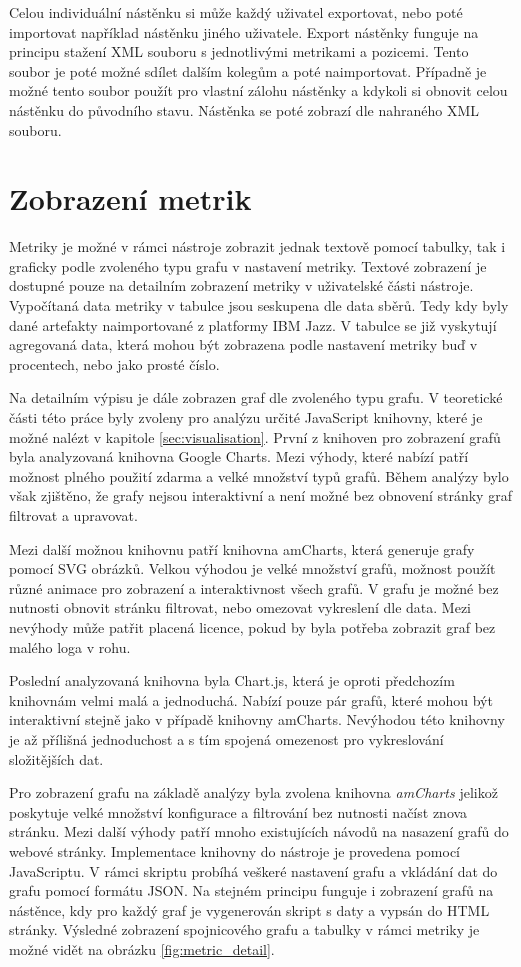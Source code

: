 \documentclass[czech,master]{diploma}
\begin{document}
Celou individuální nástěnku si může každý uživatel exportovat, nebo poté importovat například nástěnku jiného uživatele. Export nástěnky funguje na principu stažení XML souboru s jednotlivými metrikami a pozicemi. Tento soubor je poté možné sdílet dalším kolegům a poté naimportovat. Případně je možné tento soubor použít pro vlastní zálohu nástěnky a kdykoli si obnovit celou nástěnku do původního stavu. Nástěnka se poté zobrazí dle nahraného XML souboru.


\section{Zobrazení metrik}
Metriky je možné v rámci nástroje zobrazit jednak textově pomocí tabulky, tak i graficky podle zvoleného typu grafu v nastavení metriky. Textové zobrazení je dostupné pouze na detailním zobrazení metriky v uživatelské části nástroje. Vypočítaná data metriky v tabulce jsou seskupena dle data sběrů. Tedy kdy byly dané artefakty naimportované z platformy IBM Jazz. V tabulce se již vyskytují agregovaná data, která mohou být zobrazena podle nastavení metriky buď v procentech, nebo jako prosté číslo.

Na detailním výpisu je dále zobrazen graf dle zvoleného typu grafu. V teoretické části této práce byly zvoleny pro analýzu určité JavaScript knihovny, které je možné nalézt v kapitole \ref{sec:visualisation}. První z knihoven pro zobrazení grafů byla analyzovaná knihovna Google Charts. Mezi výhody, které nabízí patří možnost plného použití zdarma a velké množství typů grafů. Během analýzy bylo však zjištěno, že grafy nejsou interaktivní a není možné bez obnovení stránky graf filtrovat a upravovat.

Mezi další možnou knihovnu patří knihovna amCharts, která generuje grafy pomocí SVG obrázků. Velkou výhodou je velké množství grafů, možnost použít různé animace pro zobrazení a interaktivnost všech grafů. V grafu je možné bez nutnosti obnovit stránku filtrovat, nebo omezovat vykreslení dle data. Mezi nevýhody může patřit placená licence, pokud by byla potřeba zobrazit graf bez malého loga v rohu.

Poslední analyzovaná knihovna byla Chart.js, která je oproti předchozím knihovnám velmi malá a jednoduchá. Nabízí pouze pár grafů, které mohou být interaktivní stejně jako v případě knihovny amCharts. Nevýhodou této knihovny je až přílišná jednoduchost a s tím spojená omezenost pro vykreslování složitějších dat.

Pro zobrazení grafu na základě analýzy byla zvolena knihovna \textit{amCharts} jelikož poskytuje velké množství konfigurace a filtrování bez nutnosti načíst znova stránku. Mezi další výhody patří mnoho existujících návodů na nasazení grafů do webové stránky. Implementace knihovny do nástroje je provedena pomocí JavaScriptu. V rámci skriptu probíhá veškeré nastavení grafu a vkládání dat do grafu pomocí formátu JSON. Na stejném principu funguje i zobrazení grafů na nástěnce, kdy pro každý graf je vygenerován skript s daty a vypsán do HTML stránky. Výsledné zobrazení spojnicového grafu a tabulky v rámci metriky je možné vidět na obrázku \ref{fig:metric_detail}.
\end{document}
